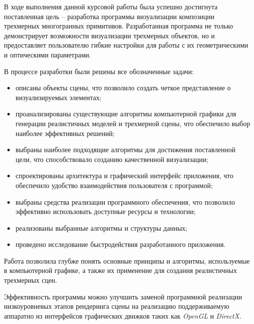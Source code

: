 
В ходе выполнения данной курсовой работы была успешно достигнута поставленная цель -- разработка программы визуализации композиции трехмерных многогранных примитивов. Разработанная программа не только демонстрирует возможности визуализации трехмерных объектов, но и предоставляет пользователю гибкие настройки для работы с их геометрическими и оптическими параметрами.

В процессе разработки были решены все обозначенные задачи:
\begin{itemize}[label=--]
	\item описаны объекты сцены, что позволило создать четкое представление о визуализируемых элементах;
	\item проанализированы существующие алгоритмы компьютерной графики для генерации реалистичных моделей и трехмерной сцены, что обеспечило выбор наиболее эффективных решений;
	\item выбраны наиболее подходящие алгоритмы для достижения поставленной цели, что способствовало созданию качественной визуализации;
	\item спроектированы архитектура и графический интерфейс приложения, что обеспечило удобство взаимодействия пользователя с программой;
	\item выбраны средства реализации программного обеспечения, что позволило эффективно использовать доступные ресурсы и технологии;
	\item реализованы выбранные алгоритмы и структуры данных;
	\item проведено исследование быстродействия разработанного приложения.
\end{itemize}

Работа позволила глубже понять основные принципы и алгоритмы, используемые в компьютерной графике, а также их применение для создания реалистичных трехмерных сцен.

Эффективность программы можно улучшить заменой программной реализации низкоуровневых этапов рендеринга сцены на реализацию поддерживаемую аппаратно из интерфейсов графических движков таких как \textit{OpenGL} и \textit{DirectX}.
